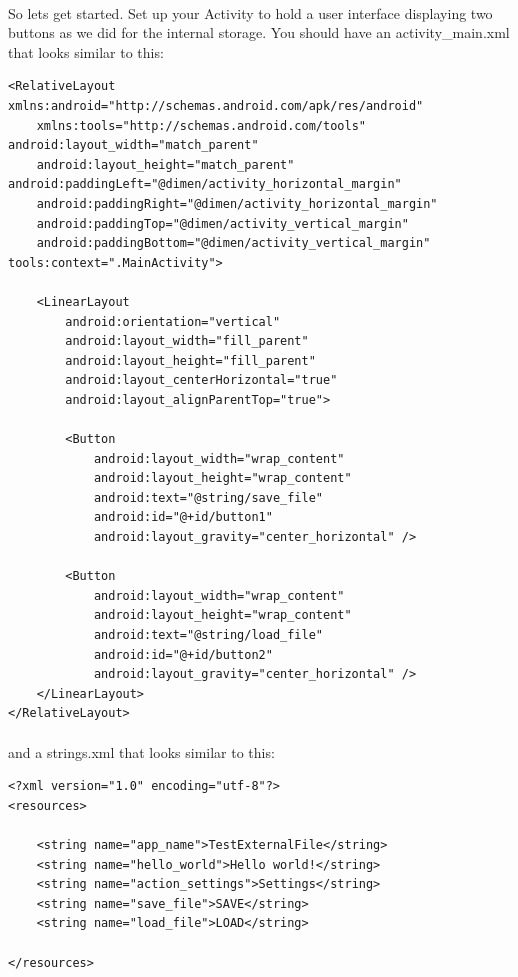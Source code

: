 \paragraph{} So lets get started. Set up your Activity to hold a user interface displaying two buttons as we did for the internal storage. You should have an activity\_main.xml that looks similar to this:

\begin{lstlisting}
<RelativeLayout xmlns:android="http://schemas.android.com/apk/res/android"
    xmlns:tools="http://schemas.android.com/tools" android:layout_width="match_parent"
    android:layout_height="match_parent" android:paddingLeft="@dimen/activity_horizontal_margin"
    android:paddingRight="@dimen/activity_horizontal_margin"
    android:paddingTop="@dimen/activity_vertical_margin"
    android:paddingBottom="@dimen/activity_vertical_margin" tools:context=".MainActivity">

    <LinearLayout
        android:orientation="vertical"
        android:layout_width="fill_parent"
        android:layout_height="fill_parent"
        android:layout_centerHorizontal="true"
        android:layout_alignParentTop="true">

        <Button
            android:layout_width="wrap_content"
            android:layout_height="wrap_content"
            android:text="@string/save_file"
            android:id="@+id/button1"
            android:layout_gravity="center_horizontal" />

        <Button
            android:layout_width="wrap_content"
            android:layout_height="wrap_content"
            android:text="@string/load_file"
            android:id="@+id/button2"
            android:layout_gravity="center_horizontal" />
    </LinearLayout>
</RelativeLayout>

\end{lstlisting}

\paragraph{} and a strings.xml that looks similar to this:

\begin{lstlisting}
<?xml version="1.0" encoding="utf-8"?>
<resources>

    <string name="app_name">TestExternalFile</string>
    <string name="hello_world">Hello world!</string>
    <string name="action_settings">Settings</string>
    <string name="save_file">SAVE</string>
    <string name="load_file">LOAD</string>

</resources>
\end{lstlisting}

